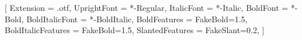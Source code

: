 \usepackage[margin=2.0cm,a5paper]{geometry}
\usepackage{fontspec}
\usepackage{graphicx}
\usepackage[greek,english,portuges]{babel}   %
\usepackage{indentfirst}


\setmainfont{GaramondLibre}[
    Extension               = .otf,
	UprightFont				= *-Regular,
    ItalicFont              = *-Italic,
    BoldFont                = *-Bold,
    BoldItalicFont          = *-BoldItalic,
    BoldFeatures            = {FakeBold=1.5},
    BoldItalicFeatures      = {FakeBold=1.5},
    SlantedFeatures         = {FakeSlant=0.2},
]



